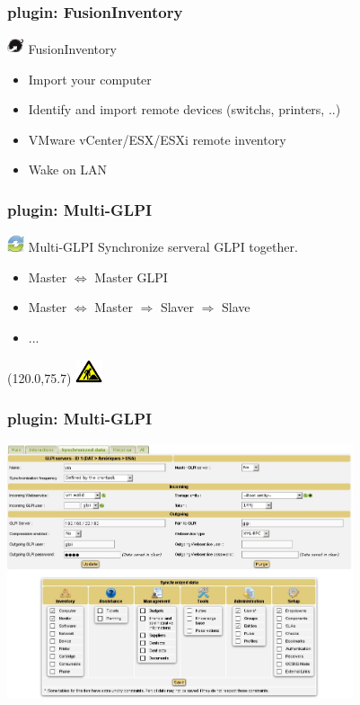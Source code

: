 \documentclass{beamer}
\newcommand{\WorkInProgress}{%
\begin{textblock}{14}(120.0,75.7)
\includegraphics[height=0.7cm]{./pics/workinprogress.jpg}
\end{textblock}
  }
\begin{document}
\begin{frame}
    \frametitle{plugin: FusionInventory}

    
    \begin{block}{\includegraphics[height=0.5cm]{./pics/plugins/fusioninventory.jpg} FusionInventory}
        \begin{itemize}
            \item Import your computer
            \item Identify and import remote devices (switchs, printers, ..)
            \item VMware vCenter/ESX/ESXi remote inventory
            \item Wake on LAN
        \end{itemize}
    \end{block}

\end{frame}


\begin{frame}
    \frametitle{plugin: Multi-GLPI}
    
    \begin{block}{\includegraphics[height=0.5cm]{./pics/plugins/multiglpi.jpg} Multi-GLPI}
        Synchronize serveral GLPI together.
        \begin{itemize}
            \item Master $\Longleftrightarrow$ Master GLPI
            \item Master $\Longleftrightarrow$ Master $\Longrightarrow$ Slaver $\Longrightarrow$ Slave
            \item ...
        \end{itemize}
    \end{block}


\WorkInProgress
\end{frame}

\begin{frame}
    \frametitle{plugin: Multi-GLPI}

    \includegraphics[height=7.5cm]{./pics/multiglpi/multiGLPi.jpg}
    



\end{frame}
\end{document}

